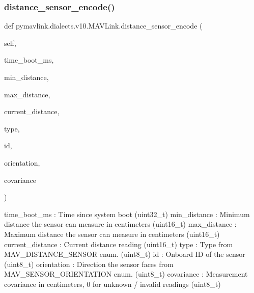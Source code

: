 \begin{DoxyVerb}
\begin{DoxyVerb}
\subsubsection{\texorpdfstring{distance\+\_\+sensor\+\_\+encode()}{distance\_sensor\_encode()}}
{\footnotesize\ttfamily def pymavlink.\+dialects.\+v10.\+M\+A\+V\+Link.\+distance\+\_\+sensor\+\_\+encode (\begin{DoxyParamCaption}\item[{}]{self,  }\item[{}]{time\+\_\+boot\+\_\+ms,  }\item[{}]{min\+\_\+distance,  }\item[{}]{max\+\_\+distance,  }\item[{}]{current\+\_\+distance,  }\item[{}]{type,  }\item[{}]{id,  }\item[{}]{orientation,  }\item[{}]{covariance }\end{DoxyParamCaption})}

\begin{DoxyVerb}time_boot_ms              : Time since system boot (uint32_t)
min_distance              : Minimum distance the sensor can measure in centimeters (uint16_t)
max_distance              : Maximum distance the sensor can measure in centimeters (uint16_t)
current_distance          : Current distance reading (uint16_t)
type                      : Type from MAV_DISTANCE_SENSOR enum. (uint8_t)
id                        : Onboard ID of the sensor (uint8_t)
orientation               : Direction the sensor faces from MAV_SENSOR_ORIENTATION enum. (uint8_t)
covariance                : Measurement covariance in centimeters, 0 for unknown / invalid readings (uint8_t)\end{DoxyVerb}
 \mbox{\label{classpymavlink_1_1dialects_1_1v10_1_1MAVLink_a4e848deb886640b622cc4d489f691059}} 

\end{DoxyVerb}
\end{DoxyVerb}

